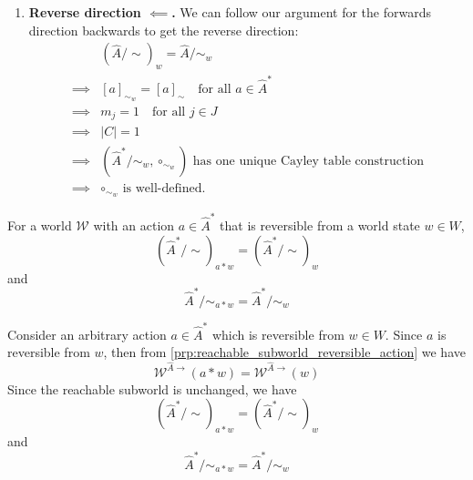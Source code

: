 \begin{proofE}
\begin{enumerate}[(1)]
    \item \textbf{Reverse direction $\impliedby$.}
    We can follow our argument for the forwards direction backwards to get the reverse direction:
    \begin{align}
        & (\hat{A}/\sim)_{w} = \hat{A}/\sim_{w} \\
        \implies & [a]_{\sim_{w}} = [a]_{\sim} \quad \text{for all $a \in \hat{A}^{*}$} \\
        \implies & m_{j} = 1 \quad \text{for all $j \in J$} \\
        \implies & |C| = 1 \\
        \implies & \text{$( \hat{A}^{*}/\sim_{w}, \circ_{\sim_{w}})$ has one unique Cayley table construction} \\
        \implies & \text{$\circ_{\sim_{w}}$ is well-defined.}
    \end{align}
\end{enumerate}
\end{proofE}


\begin{propositionE}
    For a world $\mathscr{W}$ with an action $a \in \hat{A}^{*}$ that is reversible from a world state $w \in W$,
    \begin{equation}
        (\hat{A}^{*}/\sim)_{a \ast w} = (\hat{A}^{*}/\sim)_{w}
    \end{equation}
    and
    \begin{equation}
        \hat{A}^{*}/\sim_{a \ast w} = \hat{A}^{*}/\sim_{w}
    \end{equation}
\end{propositionE}
\begin{proofE}
    Consider an arbitrary action $a \in \hat{A}^{*}$ which is reversible from $w \in W$.
    Since $a$ is reversible from $w$, then from \cref{prp:reachable_subworld_reversible_action} we have
    \begin{equation}
        \mathscr{W}^{\hat{A}\to}(a \ast w) = \mathscr{W}^{\hat{A}\to}(w)
    \end{equation}
    Since the reachable subworld is unchanged, we have
    \begin{equation}
        (\hat{A}^{*}/\sim)_{a \ast w} = (\hat{A}^{*}/\sim)_{w}
    \end{equation}
    and
    \begin{equation}
        \hat{A}^{*}/\sim_{a \ast w} = \hat{A}^{*}/\sim_{w}
    \end{equation}
\end{proofE}



